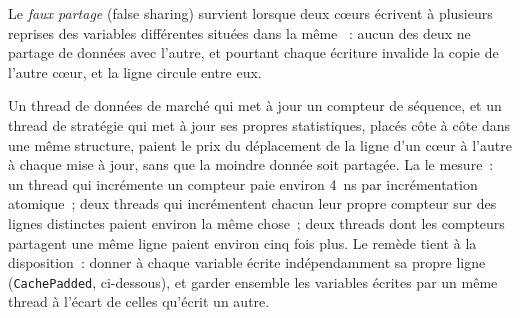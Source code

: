 \begin{definition}\label{def:ll:memory-hierarchy-and-caches:false}
Le \emph{faux partage} (false sharing) survient lorsque deux cœurs écrivent à plusieurs reprises des variables différentes situées dans la
même ~: aucun des deux ne partage de données avec l'autre, et pourtant chaque écriture invalide la copie de l'autre cœur, et la ligne
circule entre eux.
\end{definition}

Un thread de données de marché qui met à jour un compteur de séquence, et un thread de stratégie qui met à jour ses propres statistiques, placés
côte à côte dans une même structure, paient le prix du déplacement de la ligne d'un cœur à l'autre à chaque mise à jour, sans que
la moindre donnée soit partagée. La  le mesure~: un thread qui incrémente un compteur paie environ
\qty{4}{\nano\second} par incrémentation atomique~; deux threads qui incrémentent chacun leur propre compteur sur des lignes distinctes paient environ
la même chose~; deux threads dont les compteurs partagent une même ligne paient environ cinq fois plus. Le remède tient à la disposition~: donner à chaque
variable écrite indépendamment sa propre ligne (\texttt{CachePadded}, ci-dessous), et garder ensemble les variables écrites par un même thread
à l'écart de celles qu'écrit un autre.

\begin{omfigure}

\label{fig:ll:memory-hierarchy-and-caches:false}
\end{omfigure}

